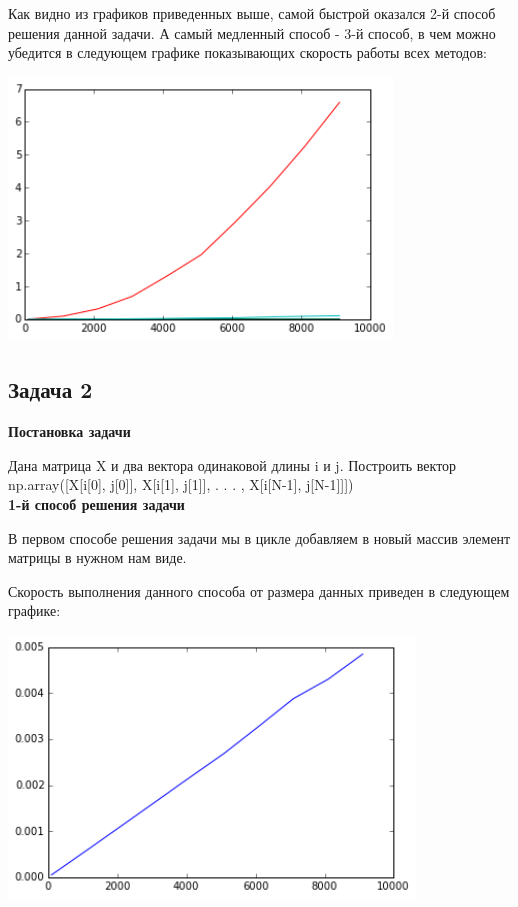 \documentclass[12pt, a4paper]{article}
\begin{document}
				Как видно из графиков приведенных выше, самой быстрой оказался 2-й способ решения данной задачи. А самый медленный способ - 3-й способ, в чем можно убедится в следующем графике показывающих скорость работы всех методов:
				\begin{center}
					\includegraphics[height=7cm]{timeit/num1_ti1234.png}
				\end{center}



		\newpage
		\subsection{Задача 2}

			{\bf Постановка задачи\\}

				Дана матрица X и два вектора одинаковой длины i и j. Построить вектор np.array([X[i[0], j[0]], X[i[1], j[1]], . . . , X[i[N-1], j[N-1]]]) \\

				{\bf 1-й способ решения задачи\\}

				В первом способе решения задачи мы в цикле добавляем в новый массив элемент матрицы в нужном нам виде.

				Скорость выполнения данного способа от размера данных приведен в следующем графике:
				\begin{center}
					\includegraphics[height=7cm]{timeit/num2_ti1.png}
				\end{center}
\end{document}
